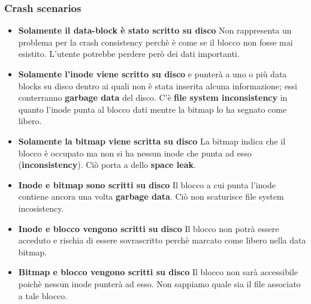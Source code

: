 \documentclass[12pt, letterpaper]{article}
\begin{document}
			\subsubsection{Crash scenarios}
				\begin{itemize}
					\item \textbf{Solamente il data-block è stato scritto su disco} Non rappresenta un problema per la crash consistency perchè è come se il blocco non fosse mai esistito. L'utente potrebbe perdere però dei dati importanti.
					\item \textbf{Solamente l'inode viene scritto su disco} e punterà a uno o più data blocks su disco dentro ai quali non è stata inserita alcuna informazione; essi conterranno \textbf{garbage data} del disco. C'è \textbf{file system inconsistency} in quanto l'inode punta al blocco dati mentre la bitmap lo ha segnato come libero.
					\item \textbf{Solamente la bitmap viene scritta su disco} La bitmap indica che il blocco è occupato ma non si ha nessun inode che punta ad esso (\textbf{inconsistency}). Ciò porta a dello \textbf{space leak}.
					\item \textbf{Inode e bitmap sono scritti su disco} Il blocco a cui punta l'inode contiene ancora una volta \textbf{garbage data}. Ciò non scaturisce file system incosistency.
					\item \textbf{Inode e blocco vengono scritti su disco} Il blocco non potrà essere acceduto e rischia di essere sovrascritto perchè marcato come libero nella data bitmap.
					\item \textbf{Bitmap e blocco vengono scritti su disco} Il blocco non sarà accessibile poichè nessun inode punterà ad esso. Non sappiamo quale sia il file associato a tale blocco.
				\end{itemize}
				
\end{document}
